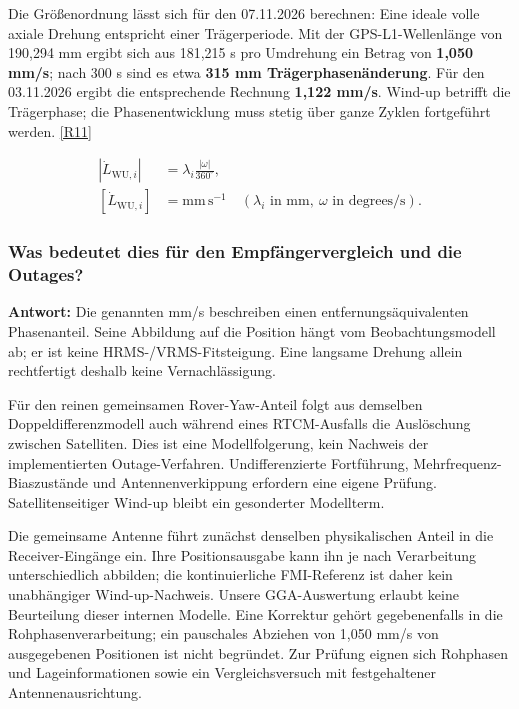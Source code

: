 \documentclass[11pt,a4paper]{article}
\numberwithin{equation}{section}
\numberwithin{figure}{section}
\begin{document}
Die Größenordnung lässt sich für den 07.11.2026 berechnen: Eine ideale volle axiale Drehung entspricht einer Trägerperiode. Mit der GPS-L1-Wellenlänge von 190,294 mm ergibt sich aus 181,215 s pro Umdrehung ein Betrag von \textbf{1,050 mm/\allowbreak{}s}; nach 300 s sind es etwa \textbf{315 mm Trägerphasenänderung}. Für den 03.11.2026 ergibt die entsprechende Rechnung \textbf{1,122 mm/\allowbreak{}s}. Wind-up betrifft die Trägerphase; die Phasenentwicklung muss stetig über ganze Zyklen fortgeführt werden. \hyperlink{ref-R11}{[R11]}

\begin{equation}\begin{aligned}\left|\dot L_{\mathrm{WU},i}\right|&=\lambda_i\frac{|\omega|}{360^{\circ}},\\ \left[\dot L_{\mathrm{WU},i}\right]&=\mathrm{mm\,s^{-1}}\quad(\lambda_i\text{ in mm},\ \omega\text{ in degrees/s}).\end{aligned}\label{eq:de-windup}\end{equation}

\subsubsection{Was bedeutet dies für den Empfängervergleich und die Outages?}

\textbf{Antwort:} Die genannten mm/\allowbreak{}s beschreiben einen entfernungsäquivalenten Phasenanteil. Seine Abbildung auf die Position hängt vom Beobachtungsmodell ab; er ist keine HRMS-/\allowbreak{}VRMS-Fitsteigung. Eine langsame Drehung allein rechtfertigt deshalb keine Vernachlässigung.

Für den reinen gemeinsamen Rover-Yaw-Anteil folgt aus demselben Doppeldifferenzmodell auch während eines RTCM-Ausfalls die Auslöschung zwischen Satelliten. Dies ist eine Modellfolgerung, kein Nachweis der implementierten Outage-Verfahren. Undifferenzierte Fortführung, Mehrfrequenz-Biaszustände und Antennenverkippung erfordern eine eigene Prüfung. Satellitenseitiger Wind-up bleibt ein gesonderter Modellterm.

Die gemeinsame Antenne führt zunächst denselben physikalischen Anteil in die Receiver-Eingänge ein. Ihre Positionsausgabe kann ihn je nach Verarbeitung unterschiedlich abbilden; die kontinuierliche FMI-Referenz ist daher kein unabhängiger Wind-up-Nachweis. Unsere GGA-Auswertung erlaubt keine Beurteilung dieser internen Modelle. Eine Korrektur gehört gegebenenfalls in die Rohphasenverarbeitung; ein pauschales Abziehen von 1,050 mm/\allowbreak{}s von ausgegebenen Positionen ist nicht begründet. Zur Prüfung eignen sich Rohphasen und Lageinformationen sowie ein Vergleichsversuch mit festgehaltener Antennenausrichtung.
\end{document}
